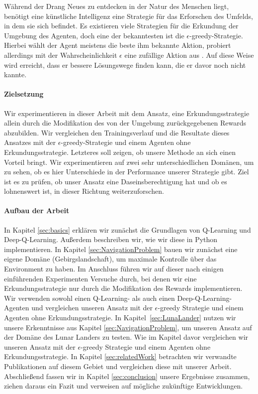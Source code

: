 Während der Drang Neues zu entdecken in der Natur des Menschen liegt, benötigt eine künstliche Intelligenz eine Strategie für das Erforschen des Umfelds, in dem sie sich befindet. Es existieren viele Strategien für die Erkundung der Umgebung des Agenten, doch eine der bekanntesten ist die $ \epsilon $-greedy-Strategie. Hierbei wählt der Agent meistens die beste ihm bekannte Aktion, probiert allerdings mit der Wahrscheinlichkeit $ \epsilon $ eine zufällige Aktion aus \cite{07_dabney2020temporallyextended, 06_sutton2018reinforcement}. Auf diese Weise wird erreicht, dass er bessere Lösungswege finden kann, die er davor noch nicht kannte.

\paragraph{Zielsetzung}
Wir experimentieren in dieser Arbeit mit dem Ansatz, eine Erkundungsstrategie allein durch die Modifikation des von der Umgebung zurückgegebenen Rewards abzubilden. Wir vergleichen den Trainingsverlauf und die Resultate dieses Ansatzes mit der $ \epsilon $-greedy-Strategie und einem Agenten ohne Erkundungsstrategie. Letzteres soll zeigen, ob unsere Methode an sich einen Vorteil bringt. Wir experimentieren auf zwei sehr unterschiedlichen Domänen, um zu sehen, ob es hier Unterschiede in der Performance unserer Strategie gibt. Ziel ist es zu prüfen, ob unser Ansatz eine Daseinsberechtigung hat und ob es lohnenswert ist, in dieser Richtung weiterzuforschen.

\paragraph{Aufbau der Arbeit}
In Kapitel \ref{sec:basics} erklären wir zunächst die Grundlagen von Q-Learning und Deep-Q-Learning. Außerdem beschreiben wir, wie wir diese in Python implementieren. In Kapitel \ref{sec:NavigationProblem} bauen wir zunächst eine eigene Domäne (Gebirgslandschaft), um maximale Kontrolle über das Environment zu haben. Im Anschluss führen wir auf dieser nach einigen einführenden Experimenten Versuche durch, bei denen wir eine Erkundungsstrategie nur durch die Modifikation des Rewards implementieren. Wir verwenden sowohl einen Q-Learning- als auch einen Deep-Q-Learning-Agenten und vergleichen unseren Ansatz mit der $ \epsilon $-greedy Strategie und einem Agenten ohne Erkundungsstrategie. In Kapitel~\ref{sec:LunaLander} nutzen wir unsere Erkenntnisse aus Kapitel \ref{sec:NavigationProblem}, um unseren Ansatz auf der Domäne des Lunar Landers zu testen. Wie im Kapitel davor vergleichen wir unseren Ansatz mit der $ \epsilon $-greedy Strategie und einem Agenten ohne Erkundungsstrategie. In Kapitel \ref{sec:relatedWork} betrachten wir verwandte Publikationen auf diesem Gebiet und vergleichen diese mit unserer Arbeit. Abschließend fassen wir in Kapitel \ref{sec:conclusion} unsere Ergebnisse zusammen, ziehen daraus ein Fazit und verweisen auf mögliche zukünftige Entwicklungen.